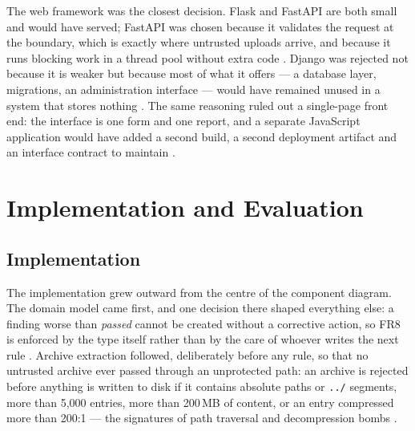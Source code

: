 \documentclass[a4paper,11pt]{article}
\begin{document}
The web framework was the closest decision. Flask and FastAPI are both small and
would have served; FastAPI was chosen because it validates the request at the
boundary, which is exactly where untrusted uploads arrive, and because it runs
blocking work in a thread pool without extra code \citep{FastAPI2025, Flask2025}.
Django was rejected not because it is weaker but because most of what it offers
--- a database layer, migrations, an administration interface --- would have
remained unused in a system that stores nothing \citep{Django2025}. The same
reasoning ruled out a single-page front end: the interface is one form and one
report, and a separate JavaScript application would have added a second build,
a second deployment artifact and an interface contract to maintain
\citep{Richards2020}.


\section{Implementation and Evaluation}\label{sec:impl}

\subsection{Implementation}\label{sec:implementation}

The implementation grew outward from the centre of the component diagram. The
domain model came first, and one decision there shaped everything else: a finding
worse than \textit{passed} cannot be created without a corrective action, so FR8
is enforced by the type itself rather than by the care of whoever writes the next
rule \citep{Percival2020}. Archive extraction followed, deliberately before any
rule, so that no untrusted archive ever passed through an unprotected path: an
archive is rejected before anything is written to disk if it contains absolute
paths or \texttt{../} segments, more than 5,000 entries, more than 200\,MB of
content, or an entry compressed more than 200:1 --- the signatures of path
traversal and decompression bombs \citep{OWASP2021, NIST2022}.
\end{document}

